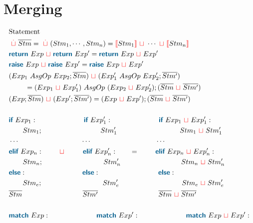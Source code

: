 \documentclass{thesis}
\newcommand{\mblue}[1]{\textbf{\textsf{\color{MidnightBlue}#1}}}
\newcommand{\nl}[1]{{\color{red}{\llbracket}}#1{\color{red}{\rrbracket}}} %
\newcommand{\mg}{~{\color{red}{\sqcup}}~} %
\begin{document}
\section{Merging}
\begin{align*}
  & \text{Statement}\\
  & \overset{\color{red}.}{\mg} \overline{Stm} = \overset{\color{red}.}{\mg}(Stm_1, \cdots ,Stm_n) = \nl{Stm_1} \mg \cdots \mg \nl{Stm_n}\\
  & \mblue{return}~Exp \mg \mblue{return}~Exp' = \mblue{return}~Exp \mg Exp'\\
  & \mblue{raise}~ Exp \mg \mblue{raise}~ Exp' = \mblue{raise}~ Exp \mg Exp'\\
  & (Exp_1 ~AsgOp~ Exp_2 ; \overline{Stm}) \mg (Exp'_1 ~AsgOp~ Exp'_2 ; \overline{Stm'})\\
  & ~~~~~~~ = (Exp_1 \mg Exp'_1) ~AsgOp~ (Exp_2 \mg Exp'_2) ; (\overline{Stm} \mg \overline{Stm'})\\
  & (Exp ; \overline{Stm}) \mg (Exp' ; \overline{Stm'}) = (Exp \mg Exp') ; (\overline{Stm} \mg \overline{Stm'})\\
  \\
  & \mblue{if}~Exp_1: ~~~~~~~~~~~~~~~~~~~~\mblue{if}~Exp'_1: ~~~~~~~~~~~~~~~~~~~~\mblue{if}~Exp_1 \mg Exp'_1:\\
  & ~~~~~~Stm_1; ~~~~~~~~~~~~~~~~~~~~~~~~~ Stm'_1 ~~~~~~~~~~~~~~~~~~~~~~~~~~~ Stm_1 \mg Stm'_1\\
  & \cdots ~~~~~~~~~~~~~~~~~~~~~~~~~~~\cdots ~~~~~~~~~~~~~~~~~~~~~~~~~~~~\cdots\\
  & \mblue{elif}~Exp_n: ~~~~~~\mg~~~~~~~\mblue{elif}~Exp'_n: ~~~~~~~=~~~~~~~\mblue{elif}~Exp_n \mg Exp'_n:\\
  & ~~~~~~Stm_n; ~~~~~~~~~~~~~~~~~~~~~~~~~~ Stm'_n ~~~~~~~~~~~~~~~~~~~~~~~~~~ Stm_n \mg Stm'_n\\
  & \mblue{else}:~~~~~~~~~~~~~~~~~~~~~~~~\mblue{else}:~~~~~~~~~~~~~~~~~~~~~~~~~\mblue{else}:~\\
  & ~~~~~~Stm_e; ~~~~~~~~~~~~~~~~~~~~~~~~~~ Stm'_e ~~~~~~~~~~~~~~~~~~~~~~~~~~~ Stm_e \mg Stm'_e\\
  & \overline{Stm} ~~~~~~~~~~~~~~~~~~~~~~~~~~ \overline{Stm'} ~~~~~~~~~~~~~~~~~~~~~~~~~~ \overline{Stm} \mg \overline{Stm'}\\
  \\
  & \mblue{match}~Exp: ~~~~~~~~~~~~~~~~~~~~\mblue{match}~Exp': ~~~~~~~~~~~~~~~~~~~~\mblue{match}~Exp \mg Exp':\\

\end{align*}
\end{document}
